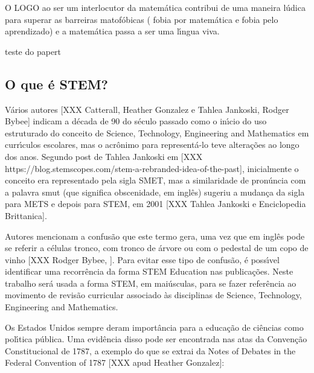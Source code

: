 \documentclass[
12pt,		%
openright,	%
twoside,  %
a4paper,			%
chapter=TITLE,		%
english,			%
french,				%
spanish,			%
brazil				%
]{USPSC-classe/USPSC_RedarTex}
\begin{document}
O LOGO ao ser um interlocutor da matem\'atica contribui de uma maneira l\'udica para superar as barreiras matof\'obicas  ( fobia por matem\'atica e fobia pelo aprendizado) e a matem\'atica passa a ser uma l\'{\i}ngua viva.








teste do papert








\subsection[O que \'e STEM?]{O que \'e STEM?}\label{O que \'e STEM?}
V\'arios autores [XXX Catterall, Heather Gonzalez e  Tahlea Jankoski, Rodger Bybee] indicam a d\'ecada de 90 do s\'eculo passado como o in\'{\i}cio do uso estruturado do conceito de Science, Technology, Engineering and Mathematics em curr\'{\i}culos escolares, mas o acr\^onimo para represent\'a-lo teve altera\c{c}\~oes ao longo dos anos. Segundo post de Tahlea Jankoski em [XXX https://blog.stemscopes.com/stem-a-rebranded-idea-of-the-past], inicialmente o conceito era representado pela sigla SMET, mas a similaridade de pron\'uncia com a palavra \textquotedbl smut (que significa obscenidade, em ingl\^es) sugeriu a mudan\c{c}a da sigla para METS e depois para STEM, em 2001 [XXX Tahlea Jankoski e Enciclopedia Brittanica]. 








Autores mencionam a confus\~ao que este termo gera, uma vez que em ingl\^es pode se referir a c\'elulas tronco, com tronco de \'arvore ou com o pedestal de um copo de vinho [XXX Rodger Bybee, ]. Para evitar esse tipo de confus\~ao, \'e poss\'{\i}vel identificar uma recorr\^encia da forma \textquotedbl STEM Education nas publica\c{c}\~oes. Neste trabalho ser\'a usada a forma STEM, em mai\'usculas, para se fazer refer\^encia ao movimento de revis\~ao curricular associado \`as disciplinas de \textquotedbl Science, Technology, Engineering and Mathematics.  








Os Estados Unidos sempre deram import\^ancia para a educa\c{c}\~ao de ci\^encias como pol\'{\i}tica p\'ublica. Uma evid\^encia disso pode ser encontrada nas atas da Conven\c{c}\~ao Constitucional de 1787, a exemplo do que se extrai da \textquotedbl Notes of Debates in the Federal Convention of 1787 [XXX apud Heather Gonzalez]:
\end{document}
